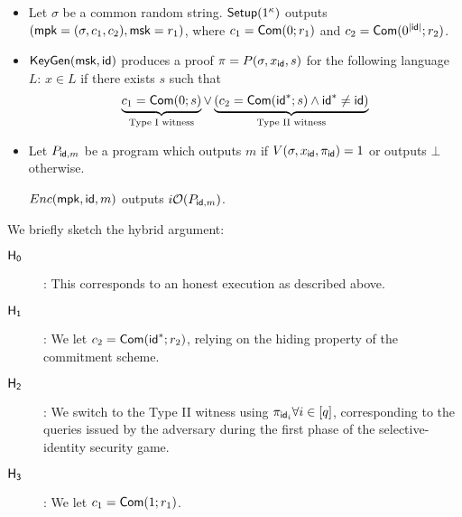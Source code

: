 \begin{itemize}
\item
	Let $\sigma$ be a common random string.
	$\mathsf{Setup}(1^\kappa)$ outputs $(\mathsf{mpk} = (\sigma, c_1, c_2), \mathsf{msk} =
	r_1)$, where $c_1 = \mathsf{Com}(0 ; r_1)$ and
	$c_2 = \mathsf{Com}(0^{|\mathsf{id}|} ; r_2)$.

\item
	$\mathsf{KeyGen}(\mathsf{msk}, \mathsf{id})$ produces a proof
	$\pi = P(\sigma, x_{\mathsf{id}}, s)$ for the following language $L$:
	$x \in L$ if there exists $s$ such that
\begin{equation*}
\underbrace{c_1 = \mathsf{Com}(0 ; s)}_{\text{Type I witness}} \lor
\underbrace{\left( c_2 = \mathsf{Com}(\mathsf{id}^* ; s) \land \mathsf{id}^* \ne \mathsf{id}
	\right)}_{\text{Type II witness}}
\end{equation*}

\item
	Let $P_{\mathsf{id},m}$ be a program which outputs $m$ if
	$V(\sigma, x_{\mathsf{id}}, \pi_{\mathsf{id}}) = 1$ or outputs $\bot$ otherwise.

	$Enc(\mathsf{mpk}, \mathsf{id}, m)$ outputs $i\mathcal{O}(P_{\mathsf{id},m})$.
\end{itemize}

We briefly sketch the hybrid argument:
\begin{description}
\item[$\mathsf{H_{0}}$]:
	This corresponds to an honest execution as described above.
\item[$\mathsf{H_{1}}$]:
	We let $c_2 = \mathsf{Com}(\mathsf{id}^* ; r_2)$, relying on the hiding property
	of the commitment scheme.
\item[$\mathsf{H_{2}}$]:
	We switch to the Type II witness using
	$\pi_{\mathsf{id}_i} \forall i \in [q]$, corresponding to the queries
	issued by the adversary during the first phase of the
	selective-identity security game.
\item[$\mathsf{H_{3}}$]:
	We let $c_1 = \mathsf{Com}(1 ; r_1)$.
\end{description}




